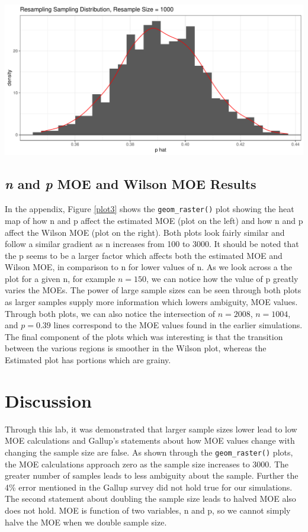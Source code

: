 \documentclass{article}\usepackage[]{graphicx}\usepackage[]{xcolor}
\newenvironment{Figure}
  {\par\medskip\noindent\minipage{\linewidth}}
  {\endminipage\par\medskip}
\begin{document}
\begin{multicols}{2}
\begin{center}
\begin{Figure}
\includegraphics[scale=0.35]{Rplot01.pdf}
\label{plot2}
\end{Figure}
\end{center}

\subsection{\textit{n} and \textit{p} MOE and Wilson MOE Results}
In the appendix, Figure \ref{plot3} shows the \verb|geom_raster()| plot showing the heat map of how n and p affect the estimated MOE (plot on the left) and how n and p affect the Wilson MOE (plot on the right). Both plots look fairly similar and follow a similar gradient as n increases from 100 to 3000. It should be noted that the p seems to be a larger factor which affects both the estimated MOE and Wilson MOE, in comparison to n for lower values of n. As we look across a the plot for a given n, for example $n = 150$, we can notice how the value of p greatly varies the MOEs. The power of large sample sizes can be seen through both plots as larger samples supply more information which lowers ambiguity, MOE values. Through both plots, we can also notice the intersection of $n = 2008$, $n = 1004$, and $p = 0.39$ lines correspond to the MOE values found in the earlier simulations. The final component of the plots which was interesting is that the transition between the various regions is smoother in the Wilson plot, whereas the Estimated plot has portions which are grainy.

\section{Discussion}
Through this lab, it was demonstrated that larger sample sizes lower lead to low MOE calculations and Gallup's statements about how MOE values change with changing the sample size are false. As shown through the \verb|geom_raster()| plots, the MOE calculations approach zero as the sample size increases to 3000. The greater number of samples leads to less ambiguity about the sample. Further the 4\% error mentioned in the Gallup survey did not hold true for our simulations. The second statement about doubling the sample size leads to halved MOE also does not hold. MOE is function of two variables, n and p, so we cannot simply halve the MOE when we double sample size.


\end{multicols}
\end{document}
